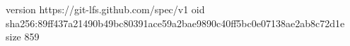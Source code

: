 version https://git-lfs.github.com/spec/v1
oid sha256:89ff437a21490b49bc80391ace59a2bae9890c40ff5bc0e07138ae2ab8c72d1e
size 859
